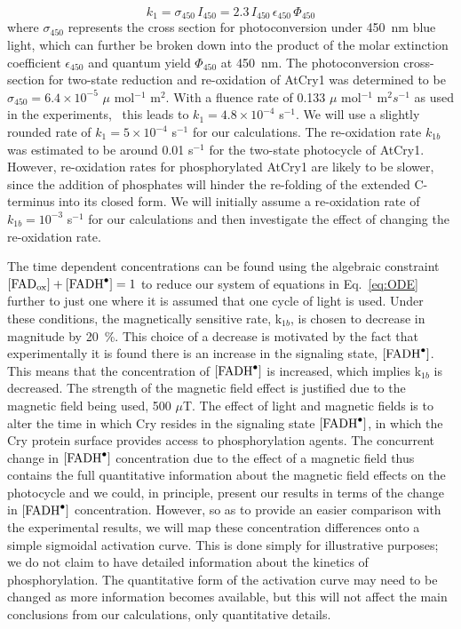 \documentclass[twoside,twocolumn,9pt]{article}
\begin{document}
\begin{equation}
	k_{1} = \sigma_{450} \, I_{450} = 2.3 \, I_{450} \, \epsilon_{450} \, \Phi_{450}
\end{equation}
where $\sigma_{450}$ represents the cross section for photoconversion under 450~nm blue light, which can further be broken down into
the product of the molar extinction coefficient $\epsilon_{450}$ and quantum yield $\Phi_{450}$ at 450~nm. The photoconversion
cross-section for two-state reduction and re-oxidation of AtCry1 was determined to be $\sigma_{450} = 6.4 \times 10^{-5}$ $\mu$
mol$^{-1}$ m$^{2}$. With a fluence rate of 0.133 $\mu$ mol$^{-1}$ m$^{2} s^{-1}$ as used in the experiments,~\cite{Hammad2019} this
leads to $k_{1} = 4.8 \times 10^{-4}$ s$^{-1}$. We will use a slightly rounded rate of $k_{1} = 5 \times 10^{-4}$ s$^{-1}$ for our
calculations. The re-oxidation rate $k_{1b}$ was estimated to be around 0.01 s$^{-1}$ for the two-state photocycle of AtCry1.
\cite{Procopio2016} However, re-oxidation rates for phosphorylated AtCry1 are likely to be slower, since the addition of phosphates
will hinder the re-folding of the extended C-terminus into its closed form. We will initially assume a re-oxidation rate of $k_{1b}
= 10^{-3}$ s$^{-1}$ for our calculations and then investigate the effect of changing the re-oxidation rate.

The time dependent concentrations can be found using the algebraic constraint $[\text{FAD}_{\text{ox}}] + [\ce{FADH^{.}}] = 1$ to
reduce our system of equations in Eq.~\ref{eq:ODE} further to just one where it is assumed that one cycle of light is used. Under
these conditions, the magnetically sensitive rate, k$_{1b}$, is chosen to decrease in magnitude by 20~\%. This choice of a decrease
is motivated \cite{Hammad2019} by the fact that experimentally it is found there is an increase in the signaling state, $
[\ce{FADH^{.}}]$. This means that the concentration of $[\ce{FADH^{.}}]$ is increased, which implies k$_{1b}$ is decreased. The
strength of the magnetic field effect is justified due to the magnetic field being used, \cite{Pooam2019, Hammad2019} 500 $\mu$T.
The effect of light and magnetic fields is to alter the time in which Cry resides in the signaling state $[\ce{FADH^{.}}]$, in which
the Cry protein surface provides access to phosphorylation agents. The concurrent change in $[\ce{FADH^{.}}]$ concentration due to
the effect of a magnetic field thus contains the full quantitative information about the magnetic field effects on the photocycle
and we could, in principle, present our results in terms of the change in $[\ce{FADH^{.}}]$ concentration. However, so as to provide
an easier comparison with the experimental results, we will map these concentration differences onto a simple sigmoidal activation 
curve. This is done simply for illustrative purposes; we do not claim to have detailed information about the kinetics of 
phosphorylation. The quantitative form of the activation curve may need to be changed as more information becomes available, but
this will not affect the main conclusions from our calculations, only quantitative details.
\end{document}
